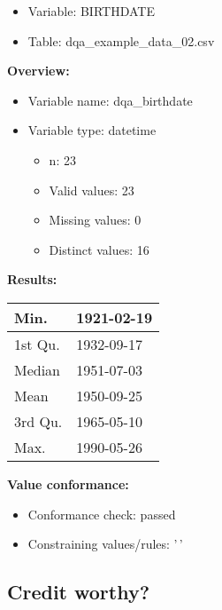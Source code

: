 \documentclass[
]{article}
\providecommand{\tightlist}{%
  \setlength{\itemsep}{0pt}\setlength{\parskip}{0pt}}
\begin{document}
\begin{itemize}
\tightlist
\item
  Variable: BIRTHDATE
\item
  Table: dqa\_example\_data\_02.csv
\end{itemize}

\textbf{Overview:}

\begin{itemize}
\tightlist
\item
  Variable name: dqa\_birthdate
\item
  Variable type: datetime

  \begin{itemize}
  \tightlist
  \item
    n: 23
  \item
    Valid values: 23
  \item
    Missing values: 0
  \item
    Distinct values: 16
  \end{itemize}
\end{itemize}

\textbf{Results:}\\

\begin{table}[H]
\centering
\begin{tabular}{l|l}
\hline
Min. & 1921-02-19\\
\hline
1st Qu. & 1932-09-17\\
\hline
Median & 1951-07-03\\
\hline
Mean & 1950-09-25\\
\hline
3rd Qu. & 1965-05-10\\
\hline
Max. & 1990-05-26\\
\hline
\end{tabular}
\end{table}

\textbf{Value conformance:}

\begin{itemize}
\tightlist
\item
  Conformance check: passed
\item
  Constraining values/rules: '\,'
\end{itemize}

\newpage

\hypertarget{credit-worthy}{%
\subsection{Credit worthy?}\label{credit-worthy}}
\end{document}
